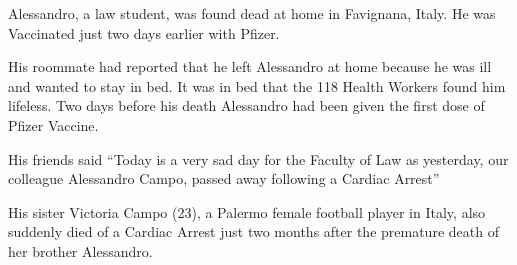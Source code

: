 Alessandro, a law student, was found dead at home in Favignana, Italy. He was
Vaccinated just two days earlier with Pfizer.

His roommate had reported that he left Alessandro at home because he was ill and
wanted to stay in bed. It was in bed that the 118 Health Workers found him
lifeless. Two days before his death Alessandro had been given the first dose of
Pfizer Vaccine.

His friends said “Today is a very sad day for the Faculty of Law as yesterday,
our colleague Alessandro Campo, passed away following a Cardiac Arrest”

His sister Victoria Campo (23), a Palermo female football player in Italy, also
suddenly died of a Cardiac Arrest just two months after the premature death of
her brother Alessandro.
